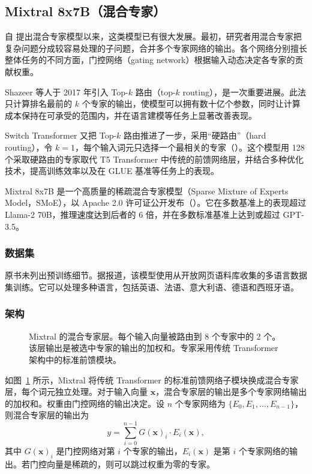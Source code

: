 \subsection{Mixtral 8x7B（混合专家）}
自 提出混合专家模型以来，这类模型已有很大发展。最初，研究者用混合专家把复杂问题分成较容易处理的子问题，合并多个专家网络的输出。各个网络分别擅长整体任务的不同方面，门控网络（gating network）根据输入动态决定各专家的贡献权重。

Shazeer 等人于 2017 年引入 Top-$k$ 路由（top-$k$ routing），是一次重要进展。此法只计算排名最前的 $k$ 个专家的输出，使模型可以拥有数十亿个参数，同时让计算成本保持在可承受的范围内，并在语言建模等任务上显著改善表现。

Switch Transformer 又把 Top-$k$ 路由推进了一步，采用“硬路由”（hard routing），令 $k=1$，每个输入词元只选择一个最相关的专家（）。这个模型用 128 个采取硬路由的专家取代 T5 Transformer 中传统的前馈网络层，并结合多种优化技术，提高训练效率以及在 GLUE 基准等任务上的表现。

Mixtral 8x7B 是一个高质量的稀疏混合专家模型（Sparse Mixture of Experts Model，SMoE），以 Apache 2.0 许可证公开发布（）。它在多数基准上的表现超过 Llama-2 70B，推理速度达到后者的 6 倍，并在多数标准基准上达到或超过 GPT-3.5。

\subsubsection{数据集}
原书未列出预训练细节。据报道，该模型使用从开放网页语料库收集的多语言数据集训练。它可以处理多种语言，包括英语、法语、意大利语、德语和西班牙语。

\subsubsection{架构}
\begin{figure}[!htbp]
\centering

\caption{Mixtral 的混合专家层。每个输入向量被路由到 8 个专家中的 2 个。该层输出是被选中专家的输出的加权和。专家采用传统 Transformer 架构中的标准前馈模块。}
\label{fig:ch02-mixtral}
\end{figure}

如图~\ref{fig:ch02-mixtral} 所示，Mixtral 将传统 Transformer 的标准前馈网络子模块换成混合专家层，每个词元独立处理。对于输入向量 $\symbf{x}$，混合专家层的输出是多个专家网络输出的加权和。权重由门控网络的输出决定。设 $n$ 个专家网络为 $\{E_0,E_1,\ldots,E_{n-1}\}$，则混合专家层的输出为
\begin{equation}
y=\sum_{i=0}^{n-1}G(\symbf{x})_i\cdot E_i(\symbf{x}),
\tag{2.39}
\end{equation}
其中 $G(\symbf{x})_i$ 是门控网络对第 $i$ 个专家的输出，$E_i(\symbf{x})$ 是第 $i$ 个专家网络的输出。若门控向量是稀疏的，则可以跳过权重为零的专家。

